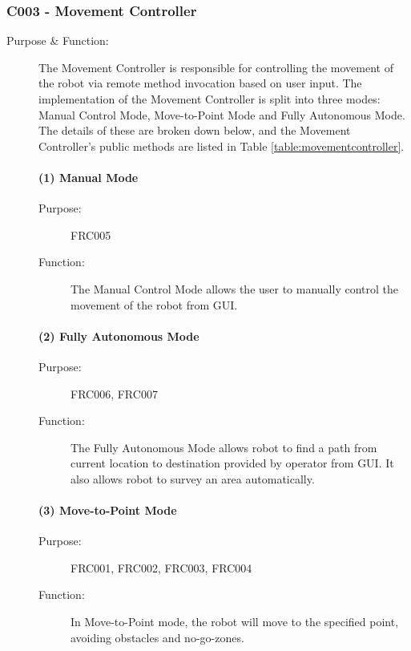 \documentclass[12pt]{article}
\begin{document}
\subsubsection{C003 - Movement Controller}\label{movement}
\begin{description}
\item [{Purpose \& Function:}] The Movement Controller is responsible for controlling the movement of the robot via remote method invocation based on user input. The implementation of the Movement Controller is split into three modes: Manual Control Mode, Move-to-Point Mode and Fully Autonomous Mode. The details of these are broken down below, and the Movement Controller's public methods are listed in Table \ref{table:movementcontroller}.
\paragraph{(1) Manual Mode}
\begin{description}
\item [{Purpose:}] FRC005
\item [{Function: }] The Manual Control Mode allows the user to manually control the movement of the robot from GUI. 
\end{description}
\paragraph{(2) Fully Autonomous Mode}
\begin{description}
\item [{Purpose:}] FRC006, FRC007
\item [{Function: }] The Fully Autonomous Mode allows robot to find a path from current location to destination provided by operator from GUI. It also allows robot to survey an area automatically.
\end{description}
\paragraph{(3) Move-to-Point Mode}
\begin{description}
\item [{Purpose:}] FRC001, FRC002, FRC003, FRC004
\item [{Function: }] In Move-to-Point mode, the robot will move to the specified point, avoiding obstacles and no-go-zones. 
\end{description}
\end{description}
\end{document}
